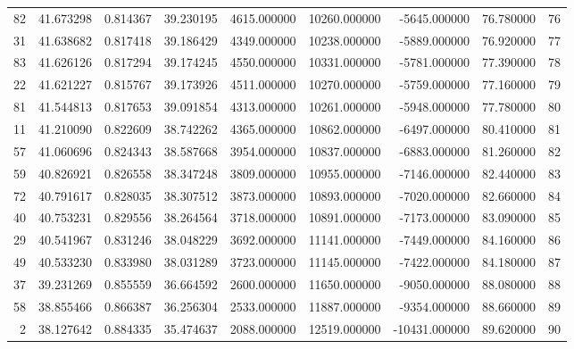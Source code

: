 \begin{tabular}{rrrrrrrrr}
82 & 41.673298 & 0.814367 & 39.230195 & 4615.000000 & 10260.000000 & -5645.000000 & 76.780000 & 76 \\
31 & 41.638682 & 0.817418 & 39.186429 & 4349.000000 & 10238.000000 & -5889.000000 & 76.920000 & 77 \\
83 & 41.626126 & 0.817294 & 39.174245 & 4550.000000 & 10331.000000 & -5781.000000 & 77.390000 & 78 \\
22 & 41.621227 & 0.815767 & 39.173926 & 4511.000000 & 10270.000000 & -5759.000000 & 77.160000 & 79 \\
81 & 41.544813 & 0.817653 & 39.091854 & 4313.000000 & 10261.000000 & -5948.000000 & 77.780000 & 80 \\
11 & 41.210090 & 0.822609 & 38.742262 & 4365.000000 & 10862.000000 & -6497.000000 & 80.410000 & 81 \\
57 & 41.060696 & 0.824343 & 38.587668 & 3954.000000 & 10837.000000 & -6883.000000 & 81.260000 & 82 \\
59 & 40.826921 & 0.826558 & 38.347248 & 3809.000000 & 10955.000000 & -7146.000000 & 82.440000 & 83 \\
72 & 40.791617 & 0.828035 & 38.307512 & 3873.000000 & 10893.000000 & -7020.000000 & 82.660000 & 84 \\
40 & 40.753231 & 0.829556 & 38.264564 & 3718.000000 & 10891.000000 & -7173.000000 & 83.090000 & 85 \\
29 & 40.541967 & 0.831246 & 38.048229 & 3692.000000 & 11141.000000 & -7449.000000 & 84.160000 & 86 \\
49 & 40.533230 & 0.833980 & 38.031289 & 3723.000000 & 11145.000000 & -7422.000000 & 84.180000 & 87 \\
37 & 39.231269 & 0.855559 & 36.664592 & 2600.000000 & 11650.000000 & -9050.000000 & 88.080000 & 88 \\
58 & 38.855466 & 0.866387 & 36.256304 & 2533.000000 & 11887.000000 & -9354.000000 & 88.660000 & 89 \\
2 & 38.127642 & 0.884335 & 35.474637 & 2088.000000 & 12519.000000 & -10431.000000 & 89.620000 & 90 \\
\bottomrule
\end{tabular}
